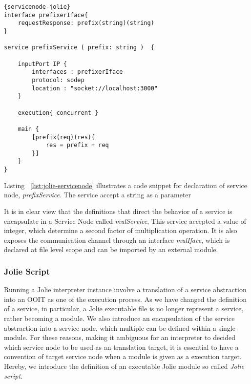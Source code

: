 \begin{listing}[h]

    \lstset{language=Jolie,
        style=codeStyle,
        numbers=left,
        firstnumber=1
    }
    \begin{lstlisting}[frame=tlrb, caption= {Jolie Service Node Example}, label={list:jolie-servicenode} ]{servicenode-jolie}
interface prefixerIface{
    requestResponse: prefix(string)(string)
}

service prefixService ( prefix: string )  {
    
    inputPort IP {
        interfaces : prefixerIface
        protocol: sodep
        location : "socket://localhost:3000"
    }

    execution{ concurrent }

    main {
        [prefix(req)(res){
            res = prefix + req
        }]
    }
}
    \end{lstlisting}
\end{listing}

Listing ~\ref{list:jolie-servicenode} illustrates a code snippet for declaration of service node, \textit{prefixService}. The service accept a string as a parameter 

 It is in clear view that the definitions that direct the behavior of a service is encapsulate in a Service Node called \textit{mulService}, This service accepted a value of integer, which determine a second factor of multiplication operation. It is also exposes the communication channel through an interface \textit{mulIface}, which is declared at file level scope and can be imported by an external module.

\FloatBarrier

\subsubsection*{Jolie Script}

Running a Jolie interpreter instance involve a translation of a service abstraction into an OOIT as one of the execution process.
As we have changed the definition of a service, in particular, a Jolie executable file is no longer represent a service, rather becoming a module.   
We also introduce an encapsulation of the service abstraction into a service node, which multiple can be defined within a single module.
For these reasons, making it ambiguous for an interpreter to decided which service node to be used as an translation target, it is essential to have a convention of target service node when a module is given as a execution target.
Hereby, we introduce the definition of an executable Jolie module so called \textit{Jolie script}.

